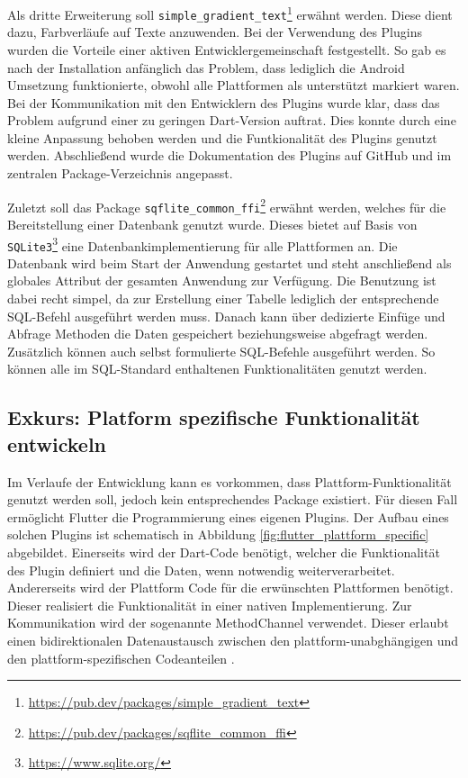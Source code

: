 Als dritte Erweiterung soll \verb|simple_gradient_text|\footnote{\url{https://pub.dev/packages/simple\_gradient\_text}} erwähnt werden. Diese dient dazu, Farbverläufe auf Texte anzuwenden. Bei der Verwendung des Plugins wurden die Vorteile einer aktiven Entwicklergemeinschaft festgestellt. So gab es nach der Installation anfänglich das Problem, dass lediglich die Android Umsetzung funktionierte, obwohl alle Plattformen als unterstützt markiert waren. Bei der Kommunikation mit den Entwicklern des Plugins wurde klar, dass das Problem aufgrund einer zu geringen Dart-Version auftrat. Dies konnte durch eine kleine Anpassung behoben werden und die Funtkionalität des Plugins genutzt werden. Abschließend wurde die Dokumentation des Plugins auf GitHub und im zentralen Package-Verzeichnis angepasst.

Zuletzt soll das Package \verb|sqflite_common_ffi|\footnote{\url{https://pub.dev/packages/sqflite\_common\_ffi}} erwähnt werden, welches für die Bereitstellung einer Datenbank genutzt wurde. Dieses bietet auf Basis von \verb|SQLite3|\footnote{\url{https://www.sqlite.org/}} eine Datenbankimplementierung für alle Plattformen an.
Die Datenbank wird beim Start der Anwendung gestartet und steht anschließend als globales Attribut der gesamten Anwendung zur Verfügung.
Die Benutzung ist dabei recht simpel, da zur Erstellung einer Tabelle lediglich der entsprechende SQL-Befehl ausgeführt werden muss.
Danach kann über dedizierte Einfüge und Abfrage Methoden die Daten gespeichert beziehungsweise abgefragt werden.
Zusätzlich können auch selbst formulierte SQL-Befehle ausgeführt werden. So können alle im SQL-Standard enthaltenen Funktionalitäten genutzt werden.


\subsection{Exkurs: Platform spezifische Funktionalität entwickeln}
Im Verlaufe der Entwicklung kann es vorkommen, dass Plattform-Funktionalität genutzt werden soll, jedoch kein entsprechendes Package existiert.
Für diesen Fall ermöglicht Flutter die Programmierung eines eigenen Plugins.
Der Aufbau eines solchen Plugins ist schematisch in Abbildung \ref{fig:flutter_plattform_specific} abgebildet. 
Einerseits wird der Dart-Code benötigt, welcher die Funktionalität des Plugin definiert und die Daten, wenn notwendig weiterverarbeitet. 
Andererseits wird der Plattform Code für die erwünschten Plattformen benötigt. Dieser realisiert die Funktionalität in einer nativen Implementierung.
Zur Kommunikation wird der sogenannte MethodChannel verwendet. Dieser erlaubt einen bidirektionalen Datenaustausch zwischen den plattform-unabghängigen und den plattform-spezifischen Codeanteilen \cite[Kapitel~12.3]{Flutter_Recipes}.

